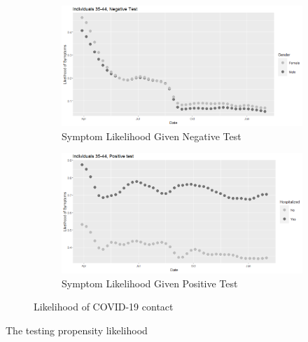 \documentclass[11pt]{amsart}
\numberwithin{equation}{section}
\theoremstyle{plain}
\begin{document}
\begin{figure}[!th]
\centering
\begin{subfigure}{.5\textwidth}
 \centering
 \includegraphics[width=.9\linewidth]{../figs/tvprop_symptom_alt_fig1.png}
 \caption{Symptom Likelihood Given Negative Test}
 \label{fig:symptomlik1}
\end{subfigure}%
\begin{subfigure}{.5\textwidth}
 \centering
\includegraphics[width=.9\linewidth]{../figs/tvprop_symptom_alt_fig2.png}
 \caption{Symptom Likelihood Given Positive Test}
 \label{fig:symptomlik2}
\end{subfigure}
\caption{Likelihood of COVID-19 contact}
\label{fig:symptomlik}
\end{figure}

The testing propensity likelihood
\end{document}
